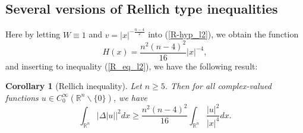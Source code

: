 \documentclass[a4paper,12pt,reqno]{amsart}
\renewcommand\eqref[1]{(\ref{#1})} %
\theoremstyle{theorem}
\numberwithin{equation}{section}
\theoremstyle{plain}
\newtheorem{cor}[thm]{Corollary}
\theoremstyle{definition}
\theoremstyle{defi}
\begin{document}
\subsection{Several versions of Rellich type inequalities}
Here by letting $W\equiv 1$ and $v=|x|^{-\frac{n-4}{2}}$ into \eqref{R-hyp_l2}, we obtain the function
\begin{equation*}
	H(x) = \frac{n^2(n-4)^2}{16}  |x|^{-4},
\end{equation*}
and inserting to inequality \eqref{R_eq_l2}, we have the following result:
\begin{cor}[Rellich inequality]
	Let $n\geq 5$. Then for all complex-valued functions $u  \in C_0^{\infty} (\mathbb{R}^n\backslash\{0\})$, we have 
	\begin{equation}
		\int_{\mathbb{R}^n} |\Delta |u||^2 dx \geq \frac{n^2(n-4)^2}{16} \int_{\mathbb{R}^n}  \frac{|u|^2}{|x|^4}dx.
	\end{equation}
\end{cor}
\end{document}
